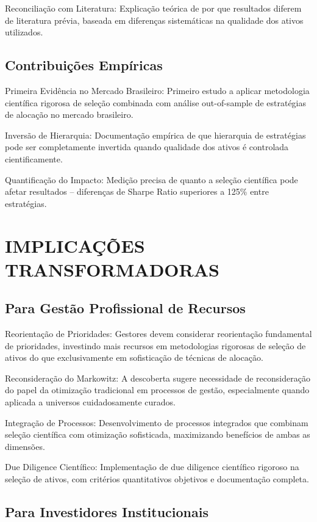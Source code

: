Reconciliação com Literatura: Explicação teórica de por que resultados diferem de literatura prévia, baseada em diferenças sistemáticas na qualidade dos ativos utilizados.

\subsection{Contribuições Empíricas}

Primeira Evidência no Mercado Brasileiro: Primeiro estudo a aplicar metodologia científica rigorosa de seleção combinada com análise out-of-sample de estratégias de alocação no mercado brasileiro.

Inversão de Hierarquia: Documentação empírica de que hierarquia de estratégias pode ser completamente invertida quando qualidade dos ativos é controlada cientificamente.

Quantificação do Impacto: Medição precisa de quanto a seleção científica pode afetar resultados – diferenças de Sharpe Ratio superiores a 125\% entre estratégias.

\section{IMPLICAÇÕES TRANSFORMADORAS}

\subsection{Para Gestão Profissional de Recursos}

Reorientação de Prioridades: Gestores devem considerar reorientação fundamental de prioridades, investindo mais recursos em metodologias rigorosas de seleção de ativos do que exclusivamente em sofisticação de técnicas de alocação.

Reconsideração do Markowitz: A descoberta sugere necessidade de reconsideração do papel da otimização tradicional em processos de gestão, especialmente quando aplicada a universos cuidadosamente curados.

Integração de Processos: Desenvolvimento de processos integrados que combinam seleção científica com otimização sofisticada, maximizando benefícios de ambas as dimensões.

Due Diligence Científico: Implementação de due diligence científico rigoroso na seleção de ativos, com critérios quantitativos objetivos e documentação completa.

\subsection{Para Investidores Institucionais}

